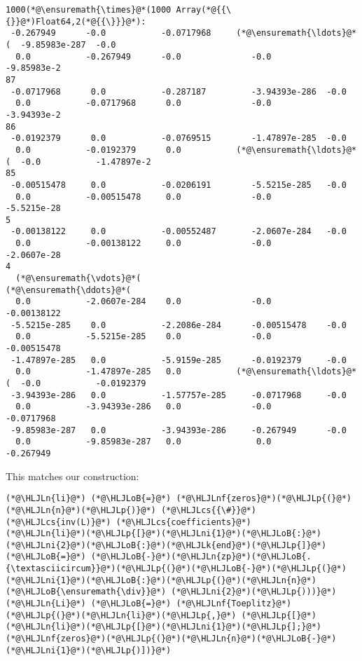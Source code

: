 \documentclass[12pt,landscape]{article}
\newcommand{\HLJLk}[1]{\textcolor[RGB]{148,91,176}{\textbf{#1}}}
\newcommand{\HLJLn}[1]{#1}
\newcommand{\HLJLnf}[1]{\textcolor[RGB]{66,102,213}{#1}}
\newcommand{\HLJLni}[1]{\textcolor[RGB]{59,151,46}{#1}}
\newcommand{\HLJLoB}[1]{\textcolor[RGB]{102,102,102}{\textbf{#1}}}
\newcommand{\HLJLp}[1]{#1}
\newcommand{\HLJLcs}[1]{\textcolor[RGB]{153,153,119}{\textit{#1}}}
\begin{document}
{\begin{lstlisting}
1000(*@\ensuremath{\times}@*(1000 Array(*@{{\{}}@*)Float64,2(*@{{\}}}@*):
 -0.267949      -0.0           -0.0717968     (*@\ensuremath{\ldots}@*(  -9.85983e-287  -0.0
  0.0           -0.267949      -0.0              -0.0           -9.85983e-2
87
 -0.0717968      0.0           -0.287187         -3.94393e-286  -0.0
  0.0           -0.0717968      0.0              -0.0           -3.94393e-2
86
 -0.0192379      0.0           -0.0769515        -1.47897e-285  -0.0
  0.0           -0.0192379      0.0           (*@\ensuremath{\ldots}@*(  -0.0           -1.47897e-2
85
 -0.00515478     0.0           -0.0206191        -5.5215e-285   -0.0
  0.0           -0.00515478     0.0              -0.0           -5.5215e-28
5
 -0.00138122     0.0           -0.00552487       -2.0607e-284   -0.0
  0.0           -0.00138122     0.0              -0.0           -2.0607e-28
4
  (*@\ensuremath{\vdots}@*(                                           (*@\ensuremath{\ddots}@*(                 
  0.0           -2.0607e-284    0.0              -0.0           -0.00138122
 -5.5215e-285    0.0           -2.2086e-284      -0.00515478    -0.0
  0.0           -5.5215e-285    0.0              -0.0           -0.00515478
 -1.47897e-285   0.0           -5.9159e-285      -0.0192379     -0.0
  0.0           -1.47897e-285   0.0           (*@\ensuremath{\ldots}@*(  -0.0           -0.0192379
 -3.94393e-286   0.0           -1.57757e-285     -0.0717968     -0.0
  0.0           -3.94393e-286   0.0              -0.0           -0.0717968
 -9.85983e-287   0.0           -3.94393e-286     -0.267949      -0.0
  0.0           -9.85983e-287   0.0               0.0           -0.267949
\end{lstlisting}


This matches our construction:


\begin{lstlisting}
(*@\HLJLn{li}@*) (*@\HLJLoB{=}@*) (*@\HLJLnf{zeros}@*)(*@\HLJLp{(}@*)(*@\HLJLn{n}@*)(*@\HLJLp{)}@*) (*@\HLJLcs{{\#}}@*) (*@\HLJLcs{inv(L)}@*) (*@\HLJLcs{coefficients}@*)
(*@\HLJLn{li}@*)(*@\HLJLp{[}@*)(*@\HLJLni{1}@*)(*@\HLJLoB{:}@*)(*@\HLJLni{2}@*)(*@\HLJLoB{:}@*)(*@\HLJLk{end}@*)(*@\HLJLp{]}@*) (*@\HLJLoB{=}@*) (*@\HLJLoB{-}@*)(*@\HLJLn{zp}@*)(*@\HLJLoB{.{\textasciicircum}}@*)(*@\HLJLp{(}@*)(*@\HLJLoB{-}@*)(*@\HLJLp{(}@*)(*@\HLJLni{1}@*)(*@\HLJLoB{:}@*)(*@\HLJLp{(}@*)(*@\HLJLn{n}@*) (*@\HLJLoB{\ensuremath{\div}}@*) (*@\HLJLni{2}@*)(*@\HLJLp{)))}@*)
(*@\HLJLn{Li}@*) (*@\HLJLoB{=}@*) (*@\HLJLnf{Toeplitz}@*)(*@\HLJLp{(}@*)(*@\HLJLn{li}@*)(*@\HLJLp{,}@*) (*@\HLJLp{[}@*)(*@\HLJLn{li}@*)(*@\HLJLp{[}@*)(*@\HLJLni{1}@*)(*@\HLJLp{];}@*) (*@\HLJLnf{zeros}@*)(*@\HLJLp{(}@*)(*@\HLJLn{n}@*)(*@\HLJLoB{-}@*)(*@\HLJLni{1}@*)(*@\HLJLp{)])}@*)
\end{lstlisting}

}
\end{document}
